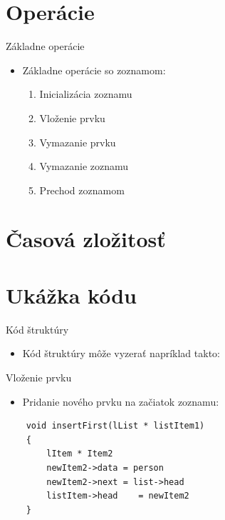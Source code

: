\documentclass[10pt,xcolor=pdflatex,hyperref={unicode}]{beamer}
\begin{document}
\section {Operácie}
\begin{frame}{Základne operácie}
    \Large
    \begin{itemize}
        \item
			Základne {\color{keyword}operácie} so zoznamom:
			\begin{enumerate}
			\large
	            \item Inicializácia zoznamu 
				\item Vloženie prvku 
				\item Vymazanie prvku 
				\item Vymazanie zoznamu 
			    \item Prechod zoznamom 
			\end{enumerate}
    \end{itemize}

\end{frame}
\section {Časová zložitosť}
\section {Ukážka kódu}
\begin{frame}[fragile]{Kód štruktúry}
\begin{itemize}
    \item Kód {\color{keyword}štruktúry} môže vyzerať napríklad takto:
\end{itemize}

\end{frame}

\begin{frame}[fragile]{Vloženie prvku}
\begin{itemize}
    \item Pridanie nového prvku na {\color{keyword}začiatok} zoznamu:
\end{itemize}
\begin{verbatim}
    void insertFirst(lList * listItem1)
    {
        lItem * Item2
        newItem2->data = person
        newItem2->next = list->head
        listItem->head    = newItem2
    }
\end{verbatim}
\end{frame}
\end{document}
